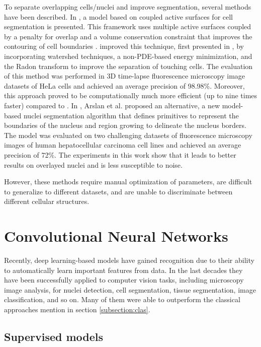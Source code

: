 To separate overlapping cells/nuclei and improve segmentation, several methods have been described. In \cite{active:couple}, a model based on coupled active surfaces for cell segmentation is presented. This framework uses multiple active surfaces coupled by a penalty for overlap and a volume conservation constraint that improves the contouring of cell boundaries \cite{couple:original}. \citet{active:couple} improved this technique, first presented in \cite{couple:original}, by incorporating watershed techniques, a \ac{non-PDE}-based energy minimization, and the Radon transform to improve the separation of touching cells. The evaluation of this method was performed in \ac{3D} time-lapse fluorescence microscopy image datasets of HeLa cells and achieved an average precision of 98.98\%. Moreover, this approach proved to be computationally much more efficient (up to nine times faster) compared to \cite{couple:original}. In \cite{graphs}, Arslan et al. proposed an alternative, a new model-based nuclei segmentation algorithm that defines primitives to represent the boundaries of the nucleus and region growing to delineate the nucleus borders. The model was evaluated on two challenging datasets of fluorescence microscopy images of human hepatocellular carcinoma cell lines and achieved an average precision of 72\%. The experiments in this work show that it leads to better results on overlayed nuclei and is less susceptible to noise.

However, these methods require manual optimization of parameters, are difficult to generalize to different datasets, and are unable to discriminate between different cellular structures. 
 
\section{Convolutional Neural Networks}

Recently, deep learning-based models have gained recognition due to their ability to automatically learn important features from data. In the last decades they have been successfully applied to computer vision tasks, including microscopy image analysis, for nuclei detection, cell segmentation, tissue segmentation, image classification, and so on. Many of them were able to outperform the classical approaches mention in section \ref{subsection:clas}.

\subsection{Supervised models}

